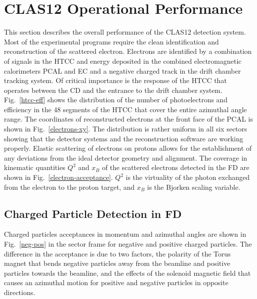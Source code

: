 \documentclass[final,3p,times,twocolumn,authoryear]{elsarticle}
\begin{document}
\section{CLAS12 Operational Performance}

This section describes the overall performance of the CLAS12 detection system. Most of the experimental programs
require the clean identification and reconstruction of the scattered electron. Electrons are identified by a combination
of signals in the HTCC and energy deposited in the combined electromagnetic calorimeters PCAL and EC and a negative
charged track in the drift chamber tracking system. Of critical importance is the response of the HTCC that operates
between the CD and the entrance to the drift chamber system. Fig.~\ref{htcc-eff} shows the distribution of the
number of photoelectrons and efficiency in the 48 segments of the HTCC that cover the entire azimuthal angle range.
The coordinates of reconstructed electrons at the front face of the PCAL is shown in Fig.~\ref{electrons-xy}. The
distribution is rather uniform in all six sectors showing that the detector systems and the reconstruction software are
working properly. Elastic scattering  of electrons on protons allows for the establishment of any deviations from the ideal
detector geometry and alignment. The coverage in kinematic quantities $Q^2$ and $x_B$ of the scattered electrons
detected in the FD are shown in Fig.~\ref{electron-acceptance}. $Q^2$ is the virtuality of the photon exchanged from
the electron to the proton target, and $x_B$ is the Bjorken scaling variable.

\subsection{Charged Particle Detection in FD}
 
Charged particles acceptances in momentum and azimuthal angles are shown in Fig.~\ref{neg-pos} in the sector frame for
negative and positive charged particles. The difference in the acceptance is due to two factors, the polarity of the Torus
magnet that bends negative particles away from the beamline and positive particles towards the beamline, and the effects
of the solenoid magnetic field that causes an azimuthal motion for positive and negative particles in opposite directions. 
\end{document}
